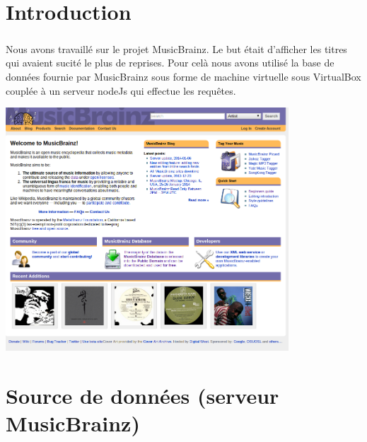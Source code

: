 \documentclass{report}
\begin{document}
\renewcommand{\contentsname}{Sommaire}
\tableofcontents
\thispagestyle{fancy}


%
\chapter*{Introduction}
\thispagestyle{fancy}
	\paragraph{}{
		Nous avons travaillé sur le projet MusicBrainz. Le but était d'afficher les titres qui avaient sucité le plus de reprises. Pour celà nous avons utilisé la base de données fournie par MusicBrainz sous forme de machine virtuelle sous VirtualBox couplée à un serveur nodeJs qui effectue les requêtes.
	}


	\begin{center}
		\includegraphics[width=400px]{images/homepage.png}
	\end{center}





%
\chapter*{Source de données (serveur MusicBrainz)}
\thispagestyle{fancy}
\end{document}
